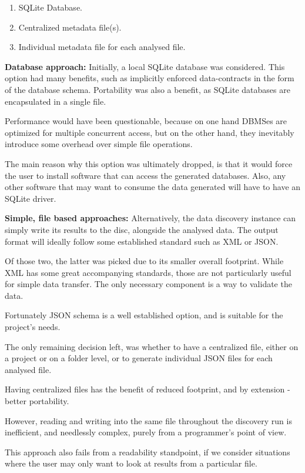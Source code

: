 \begin{enumerate}
    \item SQLite Database.
    \item Centralized metadata file(s).
    \item Individual metadata file for each analysed file.
\end{enumerate}

\textbf{Database approach:}
Initially, a local SQLite database was considered.
This option had many benefits, such as implicitly enforced data-contracts
in the form of the database schema.
Portability was also a benefit, as SQLite databases are encapsulated in a single file.

Performance would have been questionable, because on one hand DBMSes are optimized for multiple concurrent access,
but on the other hand, they inevitably introduce some overhead over simple file operations.

The main reason why this option was ultimately dropped, is that it would force the user to install software that
can access the generated databases.
Also, any other software that may want to consume the data generated will have to have an SQLite driver.

\textbf{Simple, file based approaches:}
Alternatively, the data discovery instance can simply write its results
to the disc, alongside the analysed data.
The output format will ideally follow some established standard such as XML
or JSON.

Of those two, the latter was picked due to its smaller overall footprint.
While XML has some great accompanying standards,
those are not particularly useful for simple data transfer.
The only necessary component is a way to validate the data.

Fortunately JSON schema is a well established option, and is suitable for the project's needs.

The only remaining decision left, was whether to have a centralized file, either on a project or on a folder level,
or to generate individual JSON files for each analysed file.

Having centralized files has the benefit of reduced footprint, and by extension -
better portability.

However, reading and writing into the same file throughout the discovery run is inefficient, and
needlessly complex, purely from a programmer's point of view.

This approach also fails from a readability standpoint, if we consider situations where the user
may only want to look at results from a particular file.


